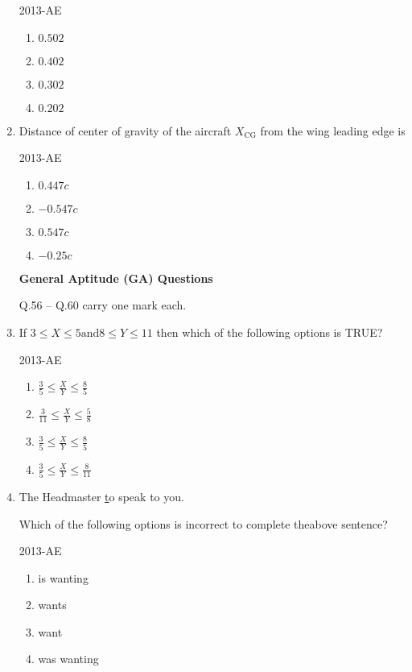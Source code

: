 \documentclass[journal]{IEEEtran}
\newcommand{\questionref}[1]{{ #1}}
\begin{document}
\begin{enumerate}
\hfill{2013-AE}

\begin{enumerate}
    \item $0.502$
    \item $0.402$
    \item $0.302$
    \item $0.202$\\
\end{enumerate}
\item \label{q55} Distance of center of gravity of the aircraft $X_{\text{CG}}$ from the wing leading edge is

\hfill{2013-AE}

\begin{enumerate}
    \item $0.447c$
    \item $-0.547c$
    \item $0.547c$
    \item $-0.25c$\\
\end{enumerate}

\textbf{General Aptitude (GA) Questions}

\questionref{Q.56} -- \questionref{Q.60} carry one mark each.\\

\item \label{Q.56} If $3 \leq X \leq 5 \text{and} 8 \leq Y \leq 11$ then which of the following options is TRUE?

\hfill{2013-AE}

\begin{enumerate}
    \item $\frac{3}{5} \leq \frac{X}{Y} \leq \frac{8}{5}$
    \item $\frac{3}{11} \leq \frac{X}{Y} \leq \frac{5}{8}$
    \item $\frac{3}{5} \leq \frac{X}{Y} \leq \frac{8}{5}$
    \item $\frac{3}{5} \leq \frac{X}{Y} \leq \frac{8}{11}$\\
\end{enumerate}

\item \label{Q.57} The Headmaster \underline to speak to you.

Which of the following options is incorrect to complete theabove sentence?

\hfill{2013-AE}

\begin{enumerate}
    \item is wanting
    \item wants
    \item want
    \item was wanting\\
\end{enumerate}


\end{enumerate}
\end{document}
